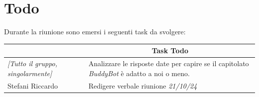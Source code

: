 \section{Todo}

Durante la riunione sono emersi i seguenti task da svolgere:

\vspace{0.5cm}

\begin{table}[htbp]
\begin{tabular}{|p{}|p{}|}
    \hline
    \rowcolor[gray]{0.9}
    \multicolumn{1}{|c|}{\textbf{Assegnatario}} & \multicolumn{1}{|c|}{\textbf{Task Todo}} \\
    \hline
    \emph{[Tutto il gruppo, singolarmente]} & Analizzare le risposte date per capire se il capitolato \emph{BuddyBot} è adatto a noi o meno. \\
    \hline
    Stefani Riccardo & Redigere verbale riunione \emph{21/10/24} \\
    \hline
\end{tabular}
\end{table}

